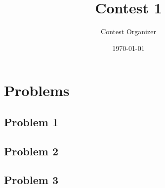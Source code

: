 \documentclass{article}
\title{Contest 1}
\author{Contest Organizer}
\date{\today}
\begin{document}
\maketitle

\section*{Problems}

\subsection*{Problem 1}

\subsection*{Problem 2}

\subsection*{Problem 3}
\end{document}
